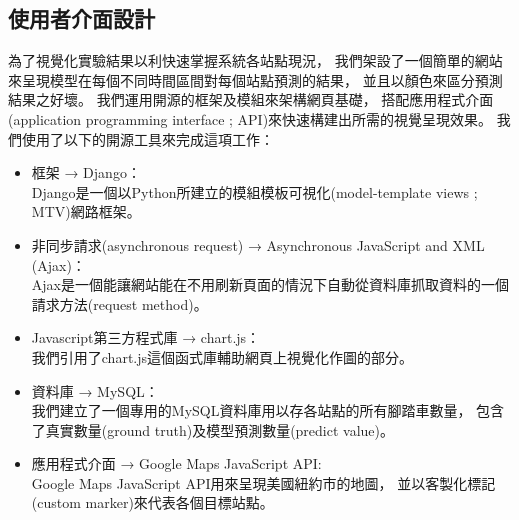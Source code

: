 \documentclass[a4paper,12pt]{extarticle}
\begin{document}
        \subsection{使用者介面設計}
            為了視覺化實驗結果以利快速掌握系統各站點現況，
            我們架設了一個簡單的網站來呈現模型在每個不同時間區間對每個站點預測的結果，
            並且以顏色來區分預測結果之好壞。
            我們運用開源的框架及模組來架構網頁基礎，
            搭配應用程式介面(application programming interface ; API)來快速構建出所需的視覺呈現效果。
            我們使用了以下的開源工具來完成這項工作：
            \begin{itemize}
                \item 框架 → Django： \\
                    Django是一個以Python所建立的模組模板可視化(model-template views ; MTV)網路框架。
                \item 非同步請求(asynchronous request) → Asynchronous JavaScript and XML (Ajax)： \\
                    Ajax是一個能讓網站能在不用刷新頁面的情況下自動從資料庫抓取資料的一個請求方法(request method)。
                \item Javascript第三方程式庫 → chart.js： \\
                    我們引用了chart.js這個函式庫輔助網頁上視覺化作圖的部分。
                \item 資料庫 → MySQL： \\
                    我們建立了一個專用的MySQL資料庫用以存各站點的所有腳踏車數量，
                    包含了真實數量(ground truth)及模型預測數量(predict value)。
                \item 應用程式介面 → Google Maps JavaScript API: \\
                    Google Maps JavaScript API用來呈現美國紐約市的地圖，
                    並以客製化標記(custom marker)來代表各個目標站點。
            \end{itemize}

            \newpage
\end{document}
